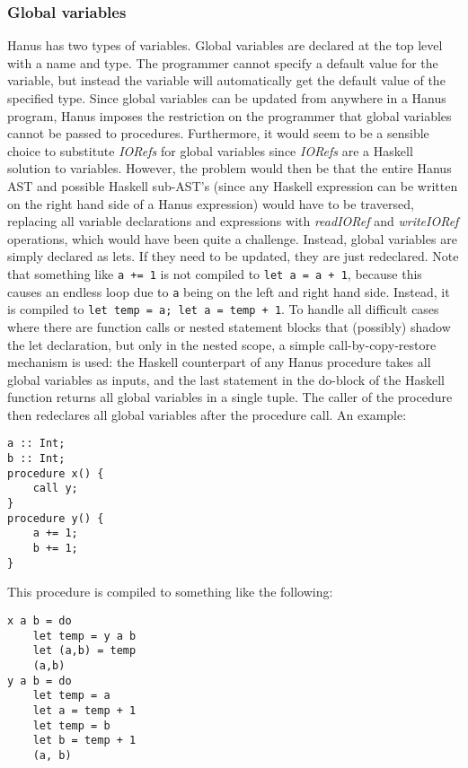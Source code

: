 \documentclass[12pt,a4paper]{article}
\newcommand{\inlinecode}[1]{\texttt{#1}}
\begin{document}
\subsubsection{Global variables}
Hanus has two types of variables. Global variables are declared at the top level with a name and type. The programmer cannot specify a default value for the variable, but instead the variable will automatically get the default value of the specified type. Since global variables can be updated from anywhere in a Hanus program, Hanus imposes the restriction on the programmer that global variables cannot be passed to procedures. Furthermore, it would seem to be a sensible choice to substitute \emph{IORefs} for global variables since \emph{IORefs} are a Haskell solution to variables. However, the problem would then be that the entire Hanus AST and possible Haskell sub-AST's (since any Haskell expression can be written on the right hand side of a Hanus expression) would have to be traversed, replacing all variable declarations and expressions with \emph{readIORef} and \emph{writeIORef} operations, which would have been quite a challenge. Instead, global variables are simply declared as lets. If they need to be updated, they are just redeclared. Note that something like \inlinecode{a += 1} is not compiled to \inlinecode{let a = a + 1}, because this causes an endless loop due to \inlinecode{a} being on the left and right hand side. Instead, it is compiled to \inlinecode{let temp = a; let a = temp + 1}. To handle all difficult cases where there are function calls or nested statement blocks that (possibly) shadow the let declaration, but only in the nested scope, a simple call-by-copy-restore mechanism is used: the Haskell counterpart of any Hanus procedure takes all global variables as inputs, and the last statement in the do-block of the Haskell function returns all global variables in a single tuple. The caller of the procedure then redeclares all global variables after the procedure call. An example:
                        
\begin{verbatim}
a :: Int;
b :: Int;
procedure x() {
    call y;
}
procedure y() {
    a += 1;
    b += 1;
}
\end{verbatim}

\noindent This procedure is compiled to something like the following:

\begin{verbatim}
x a b = do
    let temp = y a b
    let (a,b) = temp
    (a,b)
y a b = do
    let temp = a
    let a = temp + 1
    let temp = b
    let b = temp + 1
    (a, b)
\end{verbatim}
\end{document}
